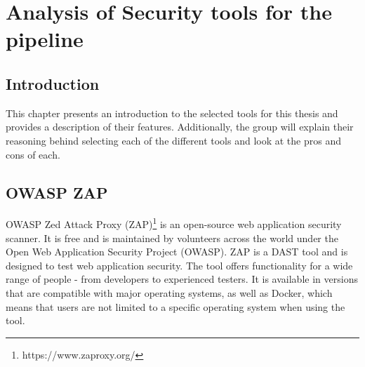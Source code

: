 \chapter{Analysis of Security tools for the pipeline}

\section{Introduction}
This chapter presents an introduction to the selected tools for this thesis and provides a description of their features. Additionally, the group will explain their reasoning behind selecting each of the different tools and look at the pros and cons of each. 




\section{OWASP ZAP}
OWASP Zed Attack Proxy (ZAP)\footnote{https://www.zaproxy.org/} is an open-source web application security scanner. It is free and is maintained by volunteers across the world under the Open Web Application Security Project (OWASP). ZAP is a DAST tool and is designed to test web application security. The tool offers functionality for a wide range of people - from developers to experienced testers. It is available in versions that are compatible with major operating systems, as well as Docker, which means that users are not limited to a specific operating system when using the tool.\cite{owaspZAP}

